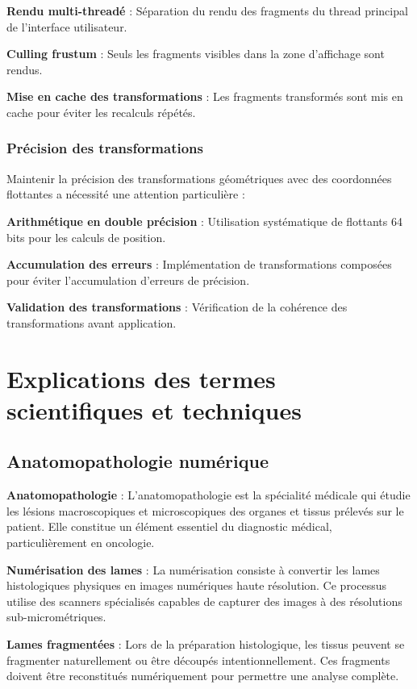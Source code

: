 \documentclass[12pt,a4paper]{report}
\begin{document}
\textbf{Rendu multi-threadé} : Séparation du rendu des fragments du thread principal de l'interface utilisateur.

\textbf{Culling frustum} : Seuls les fragments visibles dans la zone d'affichage sont rendus.

\textbf{Mise en cache des transformations} : Les fragments transformés sont mis en cache pour éviter les recalculs répétés.

\subsubsection{Précision des transformations}

Maintenir la précision des transformations géométriques avec des coordonnées flottantes a nécessité une attention particulière :

\textbf{Arithmétique en double précision} : Utilisation systématique de flottants 64 bits pour les calculs de position.

\textbf{Accumulation des erreurs} : Implémentation de transformations composées pour éviter l'accumulation d'erreurs de précision.

\textbf{Validation des transformations} : Vérification de la cohérence des transformations avant application.

\section{Explications des termes scientifiques et techniques}

\subsection{Anatomopathologie numérique}

\textbf{Anatomopathologie} : L'anatomopathologie est la spécialité médicale qui étudie les lésions macroscopiques et microscopiques des organes et tissus prélevés sur le patient. Elle constitue un élément essentiel du diagnostic médical, particulièrement en oncologie.

\textbf{Numérisation des lames} : La numérisation consiste à convertir les lames histologiques physiques en images numériques haute résolution. Ce processus utilise des scanners spécialisés capables de capturer des images à des résolutions sub-micrométriques.

\textbf{Lames fragmentées} : Lors de la préparation histologique, les tissus peuvent se fragmenter naturellement ou être découpés intentionnellement. Ces fragments doivent être reconstitués numériquement pour permettre une analyse complète.
\end{document}
